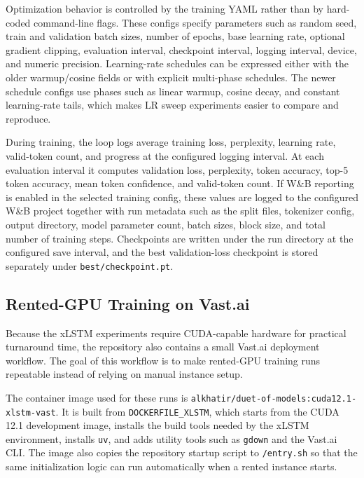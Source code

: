 Optimization behavior is controlled by the training YAML rather than by hard-coded command-line flags. These configs specify parameters such as random seed, train and validation batch sizes, number of epochs, base learning rate, optional gradient clipping, evaluation interval, checkpoint interval, logging interval, device, and numeric precision. Learning-rate schedules can be expressed either with the older warmup/cosine fields or with explicit multi-phase schedules. The newer schedule configs use phases such as linear warmup, cosine decay, and constant learning-rate tails, which makes LR sweep experiments easier to compare and reproduce.

During training, the loop logs average training loss, perplexity, learning rate, valid-token count, and progress at the configured logging interval. At each evaluation interval it computes validation loss, perplexity, token accuracy, top-5 token accuracy, mean token confidence, and valid-token count. If W\&B \citep{wandb} reporting is enabled in the selected training config, these values are logged to the configured W\&B project together with run metadata such as the split files, tokenizer config, output directory, model parameter count, batch sizes, block size, and total number of training steps. Checkpoints are written under the run directory at the configured save interval, and the best validation-loss checkpoint is stored separately under \verb|best/checkpoint.pt|.

\subsection{Rented-GPU Training on Vast.ai}

Because the xLSTM experiments require CUDA-capable hardware for practical turnaround time, the repository also contains a small Vast.ai deployment workflow. The goal of this workflow is to make rented-GPU training runs repeatable instead of relying on manual instance setup.

The container image used for these runs is \verb|alkhatir/duet-of-models:cuda12.1-xlstm-vast|. It is built from \verb|DOCKERFILE_XLSTM|, which starts from the CUDA 12.1 development image, installs the build tools needed by the xLSTM environment, installs \verb|uv|, and adds utility tools such as \verb|gdown| and the Vast.ai CLI. The image also copies the repository startup script to \verb|/entry.sh| so that the same initialization logic can run automatically when a rented instance starts.


